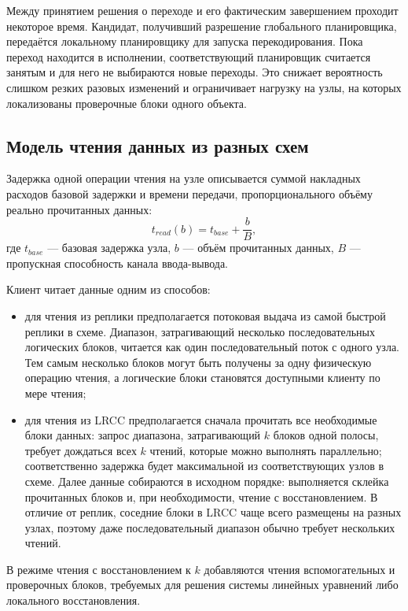 Между принятием решения о переходе и его фактическим завершением проходит
некоторое время. Кандидат, получивший разрешение глобального планировщика,
передаётся локальному планировщику для запуска перекодирования. Пока переход
находится в исполнении, соответствующий планировщик считается занятым и для
него не выбираются новые переходы. Это снижает вероятность слишком резких
разовых изменений и ограничивает нагрузку на узлы, на которых локализованы
проверочные блоки одного объекта.

\subsection{Модель чтения данных из разных схем}

Задержка одной операции чтения на узле описывается суммой накладных расходов
базовой задержки и времени передачи, пропорционального объёму реально
прочитанных данных:
\[
    t_{read}(b) = t_{base} + \frac{b}{B},
\]
где $t_{base}$ --- базовая задержка узла, $b$ --- объём прочитанных данных,
$B$ --- пропускная способность канала ввода-вывода.

Клиент читает данные одним из способов:

\begin{itemize}
  \item для чтения из реплики предполагается потоковая выдача из самой быстрой
  реплики в схеме. Диапазон, затрагивающий несколько последовательных
  логических блоков, читается как один последовательный поток с одного узла.
  Тем самым несколько блоков могут быть получены за одну физическую операцию
  чтения, а логические блоки становятся доступными клиенту по мере чтения;
  \item для чтения из LRCC предполагается сначала прочитать все необходимые
  блоки данных: запрос диапазона, затрагивающий $k$ блоков одной полосы,
  требует дождаться всех $k$ чтений, которые можно выполнять параллельно;
  соответственно задержка будет максимальной из соответствующих узлов в
  схеме. Далее данные собираются в исходном порядке: выполняется склейка
  прочитанных блоков и, при необходимости, чтение с восстановлением. В отличие
  от реплик, соседние блоки в LRCC чаще всего размещены на разных узлах,
  поэтому даже последовательный диапазон обычно требует нескольких чтений.
\end{itemize}

В режиме чтения с восстановлением к $k$ добавляются чтения вспомогательных и
проверочных блоков, требуемых для решения системы линейных уравнений либо
локального восстановления.


